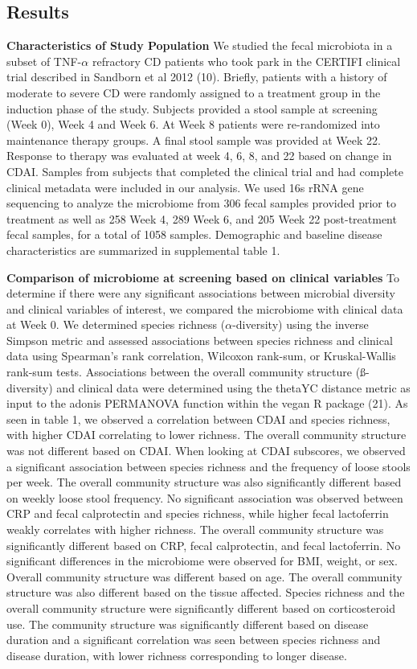 \documentclass[11pt,]{article}
\begin{document}
\subsection{Results}\label{results}

\textbf{Characteristics of Study Population} We studied the fecal
microbiota in a subset of TNF-\({\alpha}\) refractory CD patients who
took park in the CERTIFI clinical trial described in Sandborn et al 2012
(10). Briefly, patients with a history of moderate to severe CD were
randomly assigned to a treatment group in the induction phase of the
study. Subjects provided a stool sample at screening (Week 0), Week 4
and Week 6. At Week 8 patients were re-randomized into maintenance
therapy groups. A final stool sample was provided at Week 22. Response
to therapy was evaluated at week 4, 6, 8, and 22 based on change in
CDAI. Samples from subjects that completed the clinical trial and had
complete clinical metadata were included in our analysis. We used 16s
rRNA gene sequencing to analyze the microbiome from 306 fecal samples
provided prior to treatment as well as 258 Week 4, 289 Week 6, and 205
Week 22 post-treatment fecal samples, for a total of 1058 samples.
Demographic and baseline disease characteristics are summarized in
supplemental table 1.

\textbf{Comparison of microbiome at screening based on clinical
variables} To determine if there were any significant associations
between microbial diversity and clinical variables of interest, we
compared the microbiome with clinical data at Week 0. We determined
species richness (\({\alpha}\)-diversity) using the inverse Simpson
metric and assessed associations between species richness and clinical
data using Spearman's rank correlation, Wilcoxon rank-sum, or
Kruskal-Wallis rank-sum tests. Associations between the overall
community structure (ß-diversity) and clinical data were determined
using the thetaYC distance metric as input to the adonis PERMANOVA
function within the vegan R package (21). As seen in table 1, we
observed a correlation between CDAI and species richness, with higher
CDAI correlating to lower richness. The overall community structure was
not different based on CDAI. When looking at CDAI subscores, we observed
a significant association between species richness and the frequency of
loose stools per week. The overall community structure was also
significantly different based on weekly loose stool frequency. No
significant association was observed between CRP and fecal calprotectin
and species richness, while higher fecal lactoferrin weakly correlates
with higher richness. The overall community structure was significantly
different based on CRP, fecal calprotectin, and fecal lactoferrin. No
significant differences in the microbiome were observed for BMI, weight,
or sex. Overall community structure was different based on age. The
overall community structure was also different based on the tissue
affected. Species richness and the overall community structure were
significantly different based on corticosteroid use. The community
structure was significantly different based on disease duration and a
significant correlation was seen between species richness and disease
duration, with lower richness corresponding to longer disease.
\end{document}
